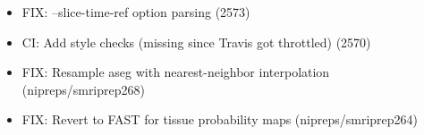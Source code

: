 \documentclass{article}
\begin{document}
\begin{appendices}
\begin{itemize}
              \begin{itemize}
                  \item FIX: --slice-time-ref option parsing (2573)
                  \item CI: Add style checks (missing since Travis got throttled) (2570)
                  \item FIX: Resample aseg with nearest-neighbor interpolation (nipreps/smriprep268)
                  \item FIX: Revert to FAST for tissue probability maps (nipreps/smriprep264)
              \end{itemize}
    \end{itemize}

\end{appendices}




\end{document}
